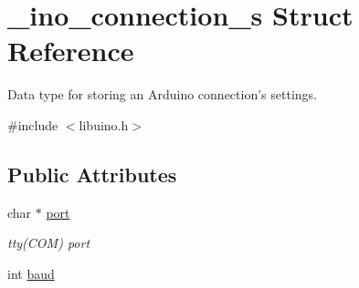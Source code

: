 \hypertarget{struct__ino__connection__s}{\section{\-\_\-ino\-\_\-connection\-\_\-s \-Struct \-Reference}
\label{struct__ino__connection__s}
}


\-Data type for storing an \-Arduino connection's settings.  




{\ttfamily \#include $<$libuino.\-h$>$}

\subsection*{\-Public \-Attributes}
\begin{DoxyCompactItemize}
\item 
\hypertarget{struct__ino__connection__s_aaf26713033414ad7ffa1d7c9ffb414a9}{char $\ast$ \hyperlink{struct__ino__connection__s_aaf26713033414ad7ffa1d7c9ffb414a9}{port}}\label{struct__ino__connection__s_aaf26713033414ad7ffa1d7c9ffb414a9}

\begin{DoxyCompactList}\small\item\em tty(\-C\-O\-M) port \end{DoxyCompactList}\item 
\hypertarget{struct__ino__connection__s_ac59c26750f9d2b726b21bddac5a6012f}{int \hyperlink{struct__ino__connection__s_ac59c26750f9d2b726b21bddac5a6012f}{baud}}\label{struct__ino__connection__s_ac59c26750f9d2b726b21bddac5a6012f}


\end{DoxyCompactItemize}
